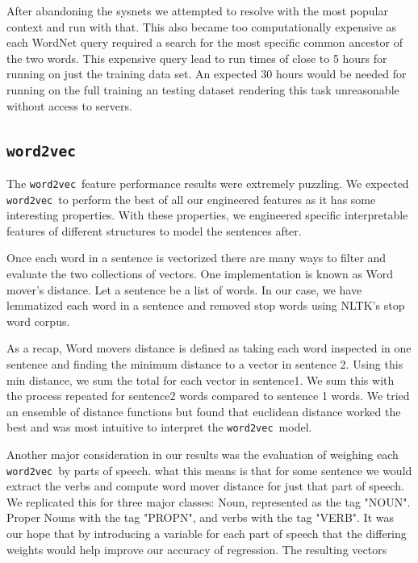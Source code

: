 \documentclass{article} %
\newcommand{\wordtvec}{\texttt{word2vec}}
\begin{document}
	After abandoning the sysnets we attempted to resolve with the most popular context and run with that. This also became too computationally expensive as each WordNet query required a search for the most specific common ancestor of the two words. This expensive query lead to run times of close to 5 hours for running on just the training data set. An expected 30 hours would be needed for running on the full training an testing dataset rendering this task unreasonable without access to servers.
	
	\subsection{\wordtvec}
	The \wordtvec\ feature performance results were extremely puzzling. We expected \wordtvec\ to perform the best of all our engineered features as it has some interesting properties. With these properties, we engineered specific interpretable features of different structures to model the sentences after.
	
	Once each word in a sentence is vectorized there are many ways to filter and evaluate the two collections of vectors. One implementation is known as Word mover's distance. Let a sentence be a list of words. In our case, we have lemmatized each word in a sentence and removed stop words using NLTK's stop word corpus. 
	
	As a recap, Word movers distance is defined as taking each word inspected in one sentence and finding the minimum distance to a vector in sentence 2. Using this min distance, we sum the total for each vector in sentence1. We sum this with the process repeated for sentence2 words compared to sentence 1 words. 
	We tried an ensemble of distance functions but found that euclidean distance worked the best and was most intuitive to interpret the \wordtvec\ model. 
	
	Another major consideration in our results was the evaluation of weighing each \wordtvec\ by parts of speech. what this means is that for some sentence we would extract the verbs and compute word mover distance for just that part of speech. We replicated this for three major classes: Noun, represented as the tag "NOUN". Proper Nouns with the tag "PROPN", and verbs with the tag "VERB". 
	It was our hope that by introducing a variable for each part of speech that the differing weights would help improve our accuracy of regression. The resulting vectors
	
\end{document}
